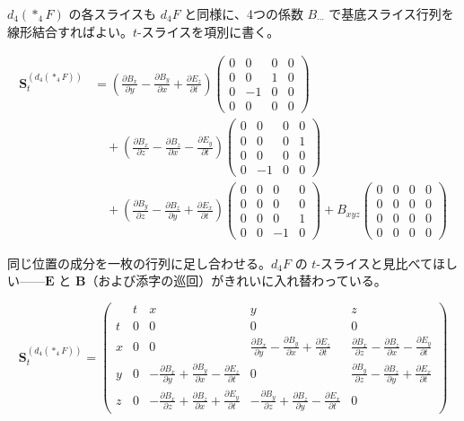\documentclass[a4paper,12pt,openany]{book}
\begin{document}
\(d_4(\ast_4F)\) の各スライスも \(d_4F\) と同様に、4つの係数
\(B_{\cdots}\)
で基底スライス行列を線形結合すればよい。\(t\)-スライスを項別に書く。

\[
\begin{aligned}
\mathbf{S}_{t}^{(d_4(\ast_4F))}
&= \left(\frac{\partial B_x}{\partial y} - \frac{\partial B_y}{\partial x} + \frac{\partial E_z}{\partial t}\right)
\begin{pmatrix}0&0&0&0\\[2pt]0&0&1&0\\[2pt]0&-1&0&0\\[2pt]0&0&0&0\end{pmatrix} \\[10pt]
&\quad+ \left(\frac{\partial B_x}{\partial z} - \frac{\partial B_z}{\partial x} - \frac{\partial E_y}{\partial t}\right)
\begin{pmatrix}0&0&0&0\\[2pt]0&0&0&1\\[2pt]0&0&0&0\\[2pt]0&-1&0&0\end{pmatrix} \\[10pt]
&\quad+ \left(\frac{\partial B_y}{\partial z} - \frac{\partial B_z}{\partial y} + \frac{\partial E_x}{\partial t}\right)
\begin{pmatrix}0&0&0&0\\[2pt]0&0&0&0\\[2pt]0&0&0&1\\[2pt]0&0&-1&0\end{pmatrix}
{+} B_{xyz}
\begin{pmatrix}0&0&0&0\\[2pt]0&0&0&0\\[2pt]0&0&0&0\\[2pt]0&0&0&0\end{pmatrix}
\end{aligned}
\]

同じ位置の成分を一枚の行列に足し合わせる。\(d_4F\) の
\(t\)-スライスと見比べてほしい——\(\mathbf{E}\) と
\(\mathbf{B}\)（および添字の巡回）がきれいに入れ替わっている。

\[
\mathbf{S}_{t}^{(d_4(\ast_4F))}
{=}
\left(\begin{array}{c|cccc}
 & t & x & y & z \\\hline
t & 0 & 0 & 0 & 0 \\[6pt]
x & 0 & 0 &
\displaystyle\frac{\partial B_x}{\partial y} {-} \frac{\partial B_y}{\partial x} {+} \frac{\partial E_z}{\partial t} &
\displaystyle\frac{\partial B_x}{\partial z} {-} \frac{\partial B_z}{\partial x} {-} \frac{\partial E_y}{\partial t} \\[14pt]
y & 0 &
\displaystyle{-}\frac{\partial B_x}{\partial y} {+} \frac{\partial B_y}{\partial x} {-} \frac{\partial E_z}{\partial t} &
0 &
\displaystyle\frac{\partial B_y}{\partial z} {-} \frac{\partial B_z}{\partial y} {+} \frac{\partial E_x}{\partial t} \\[14pt]
z & 0 &
\displaystyle{-}\frac{\partial B_x}{\partial z} {+} \frac{\partial B_z}{\partial x} {+} \frac{\partial E_y}{\partial t} &
\displaystyle{-}\frac{\partial B_y}{\partial z} {+} \frac{\partial B_z}{\partial y} {-} \frac{\partial E_x}{\partial t} &
0
\end{array}\right)
\]
\end{document}
